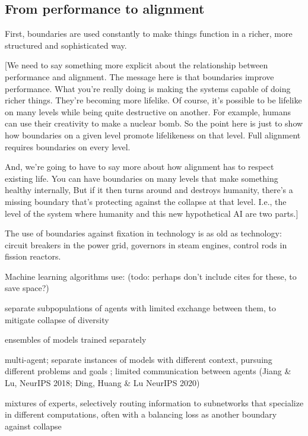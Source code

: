 \documentclass[11pt]{article}
\begin{document}
\subsection{From performance to alignment}

First, boundaries are used constantly to make things function in a richer, more structured and sophisticated way. 

[We need to say something more explicit about the relationship between performance and alignment. The message here is that boundaries improve performance. What you're really doing is making the systems capable of doing richer things. They're becoming more lifelike. Of course, it's possible to be lifelike on many levels while being quite destructive on another. For example, humans can use their creativity to make a nuclear bomb. So the point here is just to show how boundaries on a given level promote lifelikeness on that level. Full alignment requires boundaries on every level. 

And, we're going to have to say more about how alignment has to respect existing life. You can have boundaries on many levels that make something healthy internally, But if it then turns around and destroys humanity, there's a missing boundary that's protecting against the collapse at that level. I.e., the level of the system where humanity and this new hypothetical AI are two parts.]

The use of boundaries against fixation in technology is as old as technology: circuit breakers in the power grid, governors in steam engines, control rods in fission reactors. 

Machine learning algorithms use:  (todo: perhaps don't include cites for these, to save space?)

separate subpopulations of agents with limited exchange between them, to mitigate collapse of diversity \citep{holland1975adaptation, jaderberg2019human}

ensembles of models trained separately \citep{lakshminarayanan2017simple}

multi-agent; separate instances of models with different context, pursuing different problems and goals \citep{hammond2025multi}; limited communication between agents (Jiang \& Lu, NeurIPS 2018; Ding, Huang \& Lu NeurIPS 2020)

mixtures of experts, selectively routing information to subnetworks that specialize in different computations, often with a balancing loss as another boundary against collapse \citep{shazeer2017outrageously}
\end{document}
